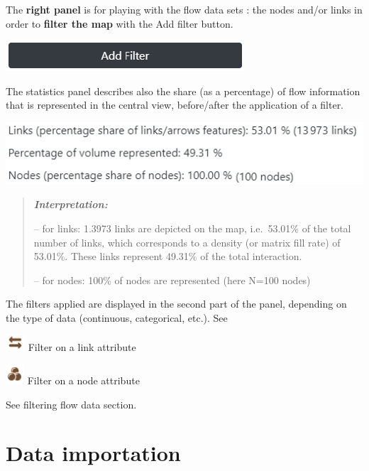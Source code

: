 \documentclass[
  letterpaper,
  DIV=11,
  numbers=noendperiod]{scrreprt}
\begin{document}
The \textbf{right panel} is for playing with the flow data sets : the
nodes and/or links in order to \textbf{filter the map} with the Add
filter button.

\includegraphics{images/Add_filter.PNG}

The statistics panel describes also the share (as a percentage) of flow
information that is represented in the central view, before/after the
application of a filter.

\includegraphics{images/Filter_statistics.png}

\begin{quote}
\textbf{\emph{Interpretation:}}

-- for links: 1.3973 links are depicted on the map, i.e.~53.01\% of the
total number of links, which corresponds to a density (or matrix fill
rate) of 53.01\%. These links represent 49.31\% of the total
interaction.

-- for nodes: 100\% of nodes are represented (here N=100 nodes)
\end{quote}

The filters applied are displayed in the second part of the panel,
depending on the type of data (continuous, categorical, etc.). See

\includegraphics{images/icon_links_filtering.png} Filter on a link
attribute

\includegraphics{images/icon_nodes_filtering.png} Filter on a node
attribute

See filtering flow data section.


\chapter{Data importation}\label{data-importation}
\end{document}
